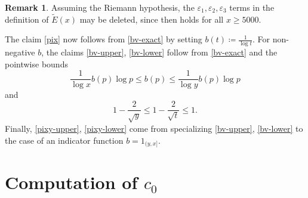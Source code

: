 \documentclass[12pt,a4paper,reqno]{amsart}
\numberwithin{equation}{section}
\theoremstyle{plain}
\theoremstyle{definition}
\newtheorem{remark}[theorem]{Remark}
\newcommand\eps{\varepsilon}
\begin{document}
\begin{remark} Assuming the Riemann hypothesis, the $\eps_1, \eps_2, \eps_3$ terms in the definition of $\tilde E(x)$ may be deleted, since \cite[(7.3)]{buthe} then holds for all $x \geq 5000$.  
\end{remark}

The claim \eqref{pix} now follows from \eqref{bv-exact} by setting $b(t) \coloneqq \frac{1}{\log t}$.  For non-negative $b$, the claims \eqref{bv-upper}, \eqref{bv-lower} follow from \eqref{bv-exact} and the pointwise bounds
$$ \frac{1}{\log x} b(p) \log p \leq b(p) \leq \frac{1}{\log y} b(p) \log p$$
and
$$ 1-\frac{2}{\sqrt{y}} \leq 1-\frac{2}{\sqrt{t}} \leq 1.$$
Finally, \eqref{pixy-upper}, \eqref{pixy-lower} come from specializing \eqref{bv-upper}, \eqref{bv-lower} to the case of an indicator function $b = 1_{(y,x]}$.



\section{Computation of \texorpdfstring{$c_0$}{c\_0}}\label{c0-app}
\end{document}
